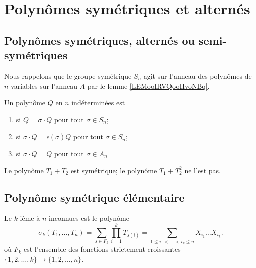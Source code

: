 \section{Polynômes symétriques et alternés}

\subsection{Polynômes symétriques, alternés ou semi-symétriques}


Nous rappelons que le groupe symétrique \( S_n\) agit sur l'anneau des polynômes de \( n\) variables sur l'anneau \( A\) par le lemme \ref{LEMooIRVQooHvoNBq}.

\begin{definition}
	Un polynôme \( Q\) en \( n\) indéterminées est
	\begin{enumerate}
		\item
		       si \( Q=\sigma\cdot Q\) pour tout \( \sigma\in S_n\);
		\item
		       si \( \sigma\cdot Q=\epsilon(\sigma)Q\) pour tout \( \sigma\in S_n\);
		\item
		       si \( \sigma\cdot Q=Q\) pour tout \( \sigma\in A_n\)
	\end{enumerate}
\end{definition}
Le polynôme \( T_1+T_2\) est symétrique; le polynôme \( T_1+T_2^2\) ne l'est pas.

\subsection{Polynôme symétrique élémentaire}

\begin{definition}  \label{DEFooTREUooZKoXeg}
	Le \( k\)-ième  à \( n\) inconnues est le polynôme
	\begin{equation}
		\sigma_k(T_1,\ldots, T_n)=\sum_{s\in F_k}\prod_{i=1}^kT_{s(i)}=\sum_{1\leq i_1<\ldots<i_k\leq n}X_{i_1}\ldots X_{i_k}.
	\end{equation}
	où \( F_k\) est l'ensemble des fonctions strictement croissantes \( \{ 1,2,\ldots, k \}\to\{ 1,2,\ldots, n \}\).
\end{definition}

